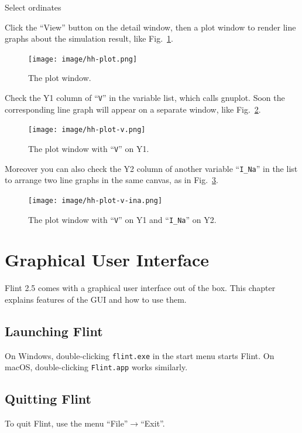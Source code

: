 \documentclass[a4paper,10pt]{report}
\begin{document}
\begin{description}
\item[{Select ordinates}] 
\end{description}
Click the ``View'' button on the detail window, then a plot window to render
line graphs about the simulation result, like Fig.~\ref{fig:org414f02f}.

\begin{figure}[htbp]
\centering
\texttt{[image: image/hh-plot.png]}
\caption{\label{fig:org414f02f}The plot window.}
\end{figure}

Check the Y1 column of ``\texttt{V}'' in the variable list, which calls gnuplot.
Soon the corresponding line graph will appear on a separate window,
like Fig.~\ref{fig:org94faaaa}.

\begin{figure}[htbp]
\centering
\texttt{[image: image/hh-plot-v.png]}
\caption{\label{fig:org94faaaa}The plot window with ``\texttt{V}'' on Y1.}
\end{figure}

Moreover you can also check the Y2 column of another variable ``\texttt{I\_Na}'' in the
list to arrange two line graphs in the same canvas, as in
Fig.~\ref{fig:org6d6ae66}.

\begin{figure}[htbp]
\centering
\texttt{[image: image/hh-plot-v-ina.png]}
\caption{\label{fig:org6d6ae66}The plot window with ``\texttt{V}'' on Y1 and ``\texttt{I\_Na}'' on Y2.}
\end{figure}

\chapter{Graphical User Interface}
\label{sec:orgafee960}
Flint 2.5 comes with a graphical user interface out of the box. This chapter
explains features of the GUI and how to use them.

\section{Launching Flint}
\label{sec:org8116e7f}
On Windows, double-clicking \texttt{flint.exe} in the start menu starts Flint.
On macOS, double-clicking \texttt{Flint.app} works similarly.

\section{Quitting Flint}
\label{sec:orgabe4ea3}
To quit Flint, use the menu ``File''\(\to\)``Exit''.
\end{document}
